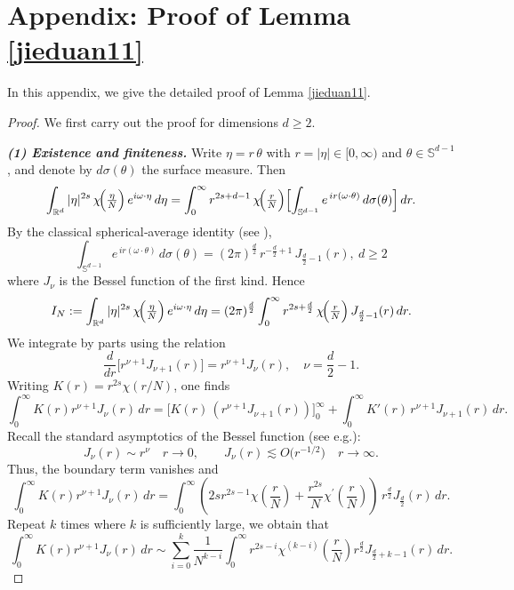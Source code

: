 \documentclass[reqno,12pt]{amsart}
\numberwithin{equation}{section}
\begin{document}
\section{Appendix: Proof of Lemma \ref{jieduan11}}

In this appendix, we give the detailed proof of Lemma \ref{jieduan11}.

\begin{proof}
	We first carry out the proof for dimensions $d \ge 2.$
	
	\textbf{\emph{(1) Existence and finiteness.}} 
	Write $\eta=r\,\theta$ with $r=|\eta|\in[0,\infty)$ and $\theta\in\mathbb{S}^{d-1}$, and denote by $d\sigma(\theta)$ the surface measure.  Then
	\[
	\int_{\mathbb{R}^d}|\eta|^{2s}\,\chi\!\Bigl(\tfrac\eta N\Bigr)\,e^{i\omega\cdot\eta}\,d\eta
	=\int_{0}^{\infty}r^{2s+d-1}\,\chi\!\Bigl(\tfrac rN\Bigr)
	\Bigl[\int_{\mathbb{S}^{d-1}}e^{\,i r(\omega\cdot\theta)}\,d\sigma(\theta)\Bigr]\,dr.
	\]
	By the classical spherical‐average identity (see \cite[B.4]{grafakos2008classical}),
	\[
	\int_{\mathbb{S}^{d-1}}e^{\,i r(\omega\cdot\theta)}\,d\sigma(\theta)
	=(2\pi)^{\frac d2}\,r^{-\frac d2+1}\,J_{\frac d2-1}(r),\:d\ge 2
	\]
	where $J_\nu$ is the Bessel function of the first kind.  Hence
	\[
	I_N
	:=\int_{\mathbb{R}^d}|\eta|^{2s}\,\chi\!\Bigl(\tfrac\eta N\Bigr)\,e^{i\omega\cdot\eta}\,d\eta
	=(2\pi)^{\frac d2}
	\int_{0}^{\infty}r^{2s+\frac d2}\,\chi\!\Bigl(\tfrac rN\Bigr)\,J_{\frac d2-1}(r)\,dr.
	\]
	We integrate by parts using the relation
	\[
	\frac{d}{dr}\bigl[r^{\nu+1}J_{\nu+1}(r)\bigr]
	=r^{\nu+1}J_{\nu}(r),
	\quad
	\nu=\frac d2-1.
	\]
	Writing $K(r)=r^{2s}\chi(r/N)$, one finds
	\[
	\int_{0}^\infty K(r)r^{\nu+1}J_{\nu}(r)\,dr
	=\bigl[K(r)\,(r^{\nu+1}J_{\nu+1}(r))\bigr]_{0}^{\infty}
	+\int_{0}^\infty K'(r)\,r^{\nu+1}J_{\nu+1}(r)\,dr.
	\]
	Recall the standard asymptotics of the Bessel function (see e.g.\cite[p.223]{olver2010nist}): 
	\begin{equation}\label{bessel}
		J_{\nu}(r)\sim r^{\nu}
		\quad r\to0,
		\qquad
		J_{\nu}(r)\lesssim O\bigl(r^{-1/2}\bigr)
		\quad r\to\infty.
	\end{equation}
	Thus, the boundary term vanishes and 
	\[
	\int_{0}^\infty K(r)r^{\nu+1}J_{\nu}(r)\,dr
	=\int_{0}^\infty\left(2sr^{2s-1}\chi\left(\frac{r}{N}\right)+\frac{r^{2s}}{N}\chi^{\prime}\left(\frac{r}{N}\right)\right)\,r^{\frac{d}{2}}J_{\frac{d}{2}}(r)\,dr.	\]
	Repeat $k$ times where $k$ is sufficiently large, we obtain that
	\[		\int_{0}^\infty K(r)r^{\nu+1}J_{\nu}(r)\,dr\sim \sum_{i=0}^{k}\frac{1}{N^{k-i}}\int_0^{\infty}r^{2s-i}\chi^{(k-i)}\left(\frac{r}{N}\right)r^{\frac{d}{2}}J_{\frac{d}{2}+k-1}(r)\,dr.\]

\end{proof}
\end{document}
